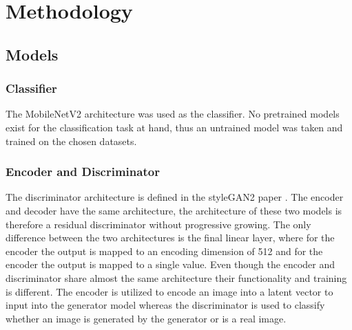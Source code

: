 \section{Methodology}
\label{sec:methodology}

\subsection{Models}


\subsubsection{Classifier}
The MobileNetV2 architecture was used as the classifier.
No pretrained models exist for the classification task at hand, thus an untrained model was taken and trained on the chosen datasets.

\subsubsection{Encoder and Discriminator}
The discriminator architecture is defined in the styleGAN2 paper \cite{karras2020analyzing}. The encoder and decoder have the same architecture, the architecture of these two models is therefore a residual discriminator without progressive growing. The only difference between the two architectures is the final linear layer, where for the encoder the output is mapped to an encoding dimension of 512 and for the encoder the output is mapped to a single value. Even though the encoder and discriminator share almost the same architecture their functionality and training is different. The encoder is utilized to encode an image into a latent vector to input into the generator model whereas the discriminator is used to classify whether an image is generated by the generator or is a real image.

